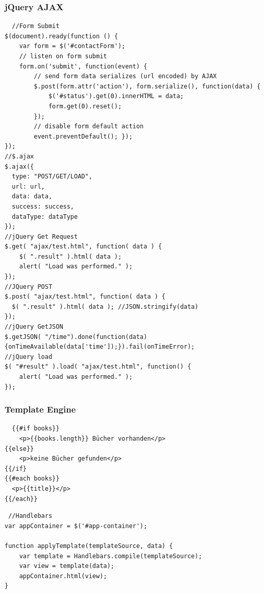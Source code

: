 \begin{multicols*}{4}
 \subsubsection{jQuery AJAX}
 
\begin{verbatim}
  //Form Submit
$(document).ready(function () {
    var form = $('#contactForm');
    // listen on form submit
    form.on('submit', function(event) {
        // send form data serializes (url encoded) by AJAX
        $.post(form.attr('action'), form.serialize(), function(data) {
            $('#status').get(0).innerHTML = data;
            form.get(0).reset();
        });
        // disable form default action
        event.preventDefault(); });
});
//$.ajax
$.ajax({
  type: "POST/GET/LOAD",
  url: url,
  data: data,
  success: success,
  dataType: dataType
});
//jQuery Get Request
$.get( "ajax/test.html", function( data ) {
    $( ".result" ).html( data );
    alert( "Load was performed." );
});
//JQuery POST
$.post( "ajax/test.html", function( data ) {
  $( ".result" ).html( data ); //JSON.stringify(data)
});
//jQuery GetJSON
$.getJSON( "/time").done(function(data)
{onTimeAvailable(data['time']);}).fail(onTimeError);
//jQuery load
$( "#result" ).load( "ajax/test.html", function() {
    alert( "Load was performed." );
});
\end{verbatim}


\subsubsection{Template Engine}
\begin{verbatim}
  {{#if books}}
	<p>{{books.length}} Bücher vorhanden</p>
{{else}}
	<p>keine Bücher gefunden</p>
{{/if}
{{#each books}}
  <p>{{title}}</p>
{{/each}}
\end{verbatim}

\begin{verbatim}
 //Handlebars
var appContainer = $('#app-container');

function applyTemplate(templateSource, data) {
	var template = Handlebars.compile(templateSource);
	var view = template(data);
	appContainer.html(view);
}


\end{verbatim}
\end{multicols*}
